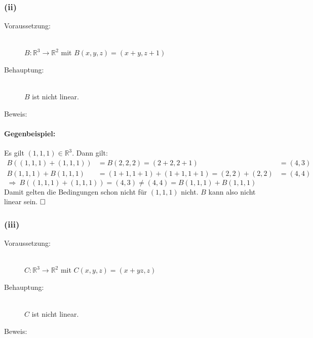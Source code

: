 \documentclass[10pt, a4paper]{article}
\begin{document}

		\subsubsection*{(ii)} %
		\label{ssub:ii}
		
			\begin{description}
				\item[Voraussetzung:] \hfill \\
					$B:\mathbb{R}^3\longrightarrow \mathbb{R}^2$ mit $B(x,y,z) = (x+y,z+1)$
				\item[Behauptung:] \hfill \\
					$B$ ist nicht linear.
				\item[Beweis:]
			\end{description}
			
			\paragraph{Gegenbeispiel:} %
			\label{par:gegenbeispiel_}
			
				Es gilt $(1,1,1) \in \mathbb{R}^3$. Dann gilt:
				\begin{align*}
					B((1,1,1)+(1,1,1)) &= B(2,2,2) = (2+2,2+1) &= (4,3) \\
					B(1,1,1)+B(1,1,1) &= (1+1,1+1)+(1+1,1+1) = (2,2)+(2,2) &= (4,4) 
				\end{align*}
				\[
					\Rightarrow \ B((1,1,1)+(1,1,1)) = (4,3) \neq (4,4) = B(1,1,1)+B(1,1,1) 
				\]
				Damit gelten die Bedingungen schon nicht für $(1,1,1)$ nicht. $B$ kann also nicht linear sein. $\hfill\Box$



		\newpage

		\subsubsection*{(iii)} %
		\label{ssub:iii}
		
			\begin{description}
				\item[Voraussetzung:] \hfill \\
					$C:\mathbb{R}^3\longrightarrow \mathbb{R}^2$ mit $C(x,y,z) = (x+yz,z)$
				\item[Behauptung:] \hfill \\
					$C$ ist nicht linear.
				\item[Beweis:]
			\end{description}
			
\end{document}

